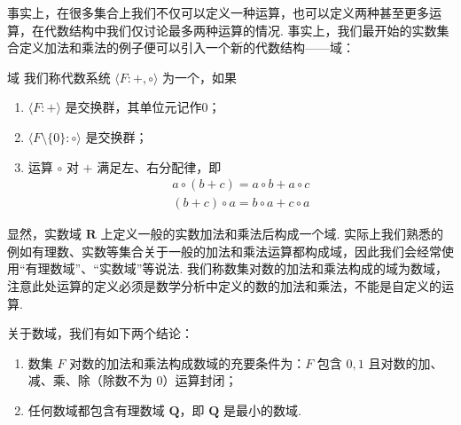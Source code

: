 事实上，在很多集合上我们不仅可以定义一种运算，也可以定义两种甚至更多运算，在代数结构中我们仅讨论最多两种运算的情况. 事实上，我们最开始的实数集合定义加法和乘法的例子便可以引入一个新的代数结构——域：
\begin{definition}{域}{} 
    我们称代数系统 $\langle F\colon+,\circ\rangle$ 为一个，如果
    \begin{enumerate}
        \item $\langle F\colon+\rangle$ 是交换群，其单位元记作0；

        \item $\langle F\setminus\{0\}\colon\circ\rangle$ 是交换群；

        \item 运算 $\circ$ 对 $+$ 满足左、右分配律，即
              \begin{gather*}
                  a \circ (b + c) = a \circ b + a \circ c \\
                  (b + c) \circ a = b \circ a + c \circ a
              \end{gather*}
    \end{enumerate}
\end{definition}

显然，实数域 $\mathbf{R}$ 上定义一般的实数加法和乘法后构成一个域. 实际上我们熟悉的例如有理数、实数等集合关于一般的加法和乘法运算都构成域，因此我们会经常使用``有理数域''、``实数域''等说法. 我们称数集对数的加法和乘法构成的域为数域，注意此处运算的定义必须是数学分析中定义的数的加法和乘法，不能是自定义的运算.

\begin{theorem}{}{}
    关于数域，我们有如下两个结论：
    \begin{enumerate}
        \item 数集 $F$ 对数的加法和乘法构成数域的充要条件为：$F$ 包含 $0,1$ 且对数的加、减、乘、除（除数不为 $0$）运算封闭；

        \item 任何数域都包含有理数域 $\mathbf{Q}$，即 $\mathbf{Q}$ 是最小的数域.
    \end{enumerate}
\end{theorem}

